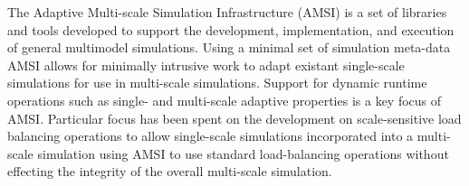 The Adaptive Multi-scale Simulation Infrastructure (AMSI) is a set of libraries and tools developed to support the development, implementation, and execution of general multimodel simulations. Using a minimal set of simulation meta-data AMSI allows for minimally intrusive work to adapt existant single-scale simulations for use in multi-scale simulations. Support for dynamic runtime operations such as single- and multi-scale adaptive properties is a key focus of AMSI. Particular focus has been spent on the development on scale-sensitive load balancing operations to allow single-scale simulations incorporated into a multi-scale simulation using AMSI to use standard load-balancing operations without effecting the integrity of the overall multi-scale simulation. 


